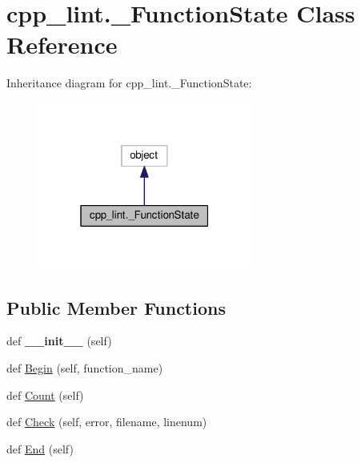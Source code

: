 \hypertarget{classcpp__lint_1_1___function_state}{}\section{cpp\+\_\+lint.\+\_\+\+Function\+State Class Reference}
\label{classcpp__lint_1_1___function_state}


Inheritance diagram for cpp\+\_\+lint.\+\_\+\+Function\+State\+:
\nopagebreak
\begin{figure}[H]
\begin{center}
\leavevmode
\includegraphics[width=199pt]{classcpp__lint_1_1___function_state__inherit__graph}
\end{center}
\end{figure}
\subsection*{Public Member Functions}
\begin{DoxyCompactItemize}
\item 
\mbox{\label{classcpp__lint_1_1___function_state_abf4562c0dd1c6151cfc5f3088a7294dc}} 
def {\bfseries \+\_\+\+\_\+init\+\_\+\+\_\+} (self)
\item 
def \mbox{\hyperlink{classcpp__lint_1_1___function_state_a91b36d276e1cf17350786a0510516674}{Begin}} (self, function\+\_\+name)
\item 
def \mbox{\hyperlink{classcpp__lint_1_1___function_state_a402797f40424f11da27896926362b23f}{Count}} (self)
\item 
def \mbox{\hyperlink{classcpp__lint_1_1___function_state_a74430cb0bb43e253f617bba640391d09}{Check}} (self, error, filename, linenum)
\item 
def \mbox{\hyperlink{classcpp__lint_1_1___function_state_a6d78fb5729c971706f781918291e4a0b}{End}} (self)
\end{DoxyCompactItemize}
